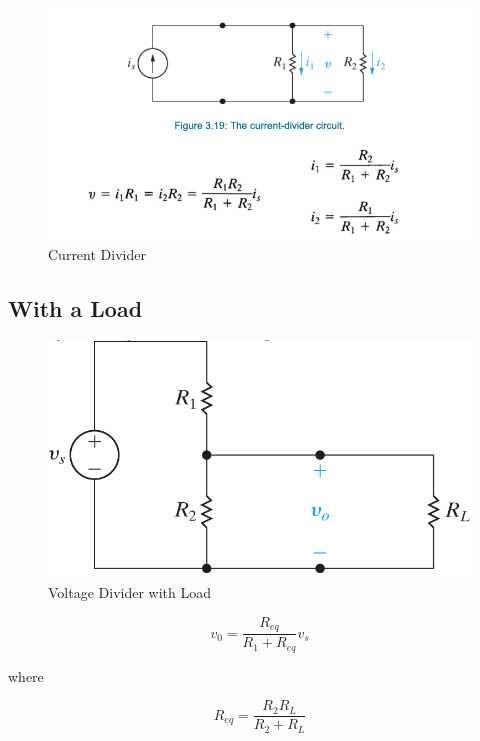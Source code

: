 \documentclass[14pt]{memoir}
\begin{document}
\begin{figure}[H]
\begin{center}
\includegraphics[scale=0.50]{fig/fig03_19.png}
\caption{Current Divider}
\label{fig:fig03_19}
\end{center}
\end{figure}

\subsection{With a Load}

\begin{figure}[H]
\begin{center}
\includegraphics[scale=0.50]{fig/fig03_17.png}
\caption{Voltage Divider with Load}
\label{fig:fig03_17}
\end{center}
\end{figure}

\begin{equation}
v_0 = \frac{R_{eq}}{R_1+R_{eq}} v_s
\end{equation}

where

\begin{equation}
R_{eq} = \frac{R_2 R_L}{R_2 + R_L}
\end{equation}
\end{document}

